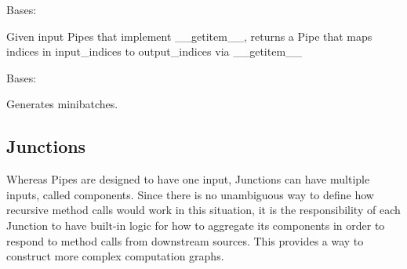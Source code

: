 \documentclass[letterpaper,10pt,english]{sphinxmanual}
\begin{document}
\begin{fulllineitems}
\label{\detokenize{Fireworks:Fireworks.toolbox.pipes.IndexMapperPipe}}
Bases: {\hyperref[\detokenize{Fireworks:Fireworks.core.pipe.Pipe}]{}}

Given input Pipes that implement \_\_getitem\_\_, returns a Pipe that maps indices in input\_indices to output\_indices via \_\_getitem\_\_

\begin{fulllineitems}
\label{\detokenize{Fireworks:Fireworks.toolbox.pipes.IndexMapperPipe.check_input}}
\end{fulllineitems}


\end{fulllineitems}


\begin{fulllineitems}
\label{\detokenize{Fireworks:Fireworks.toolbox.pipes.BatchingPipe}}
Bases: {\hyperref[\detokenize{Fireworks:Fireworks.core.pipe.Pipe}]{}}

Generates minibatches.

\begin{fulllineitems}
\label{\detokenize{Fireworks:Fireworks.toolbox.pipes.BatchingPipe.reset}}
\end{fulllineitems}


\end{fulllineitems}



\subsection{Junctions}
\label{\detokenize{Fireworks:junctions}}
Whereas Pipes are designed to have one input, Junctions can have multiple inputs, called components. Since there is no unambiguous way to
define how recursive method calls would work in this situation, it is the responsibility of each Junction to have built-in logic for how to
aggregate its components in order to respond to method calls from downstream sources. This provides a way to construct more complex
computation graphs.
\end{document}
